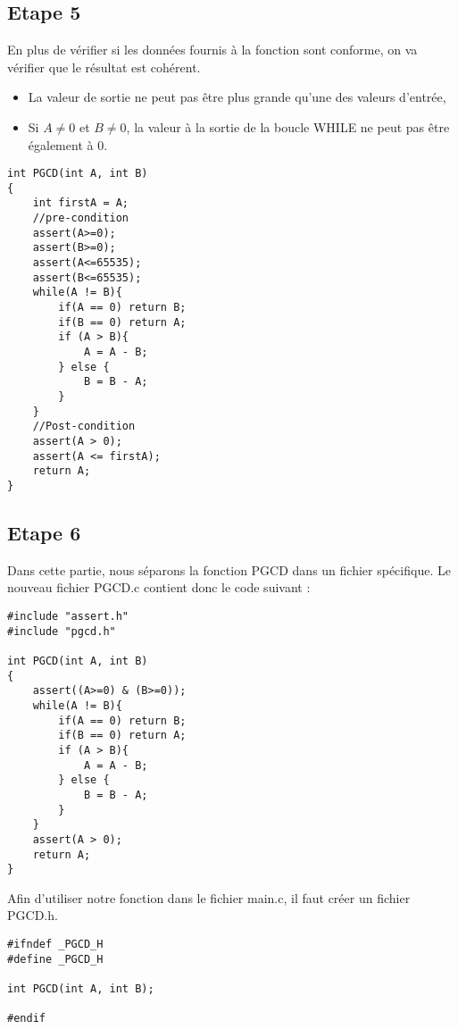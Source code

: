 \documentclass[a4paper]{article}
\begin{document}
    \subsection{Etape 5}
        En plus de vérifier si les données fournis à la fonction sont conforme, on va vérifier que le résultat est cohérent.
        \begin{itemize}
            \item La valeur de sortie ne peut pas être plus grande qu'une des valeurs d'entrée,
            \item Si $A \neq 0$ et $B \neq 0$, la valeur à la sortie de la boucle WHILE ne peut pas être également à 0.
        \end{itemize}
\begin{lstlisting}[style=CStyle]
int PGCD(int A, int B)
{
	int firstA = A;
    //pre-condition
	assert(A>=0);
	assert(B>=0);
	assert(A<=65535);
	assert(B<=65535);
	while(A != B){
		if(A == 0) return B;
		if(B == 0) return A;
		if (A > B){
			A = A - B;
		} else {
			B = B - A;
		}
	}
    //Post-condition
	assert(A > 0);
	assert(A <= firstA);
	return A;
}
\end{lstlisting}
        
    \subsection{Etape 6}
       Dans cette partie, nous séparons la fonction PGCD dans un fichier spécifique.
       Le nouveau fichier PGCD.c contient donc le code suivant :
\begin{lstlisting}[style=CStyle]
#include "assert.h"
#include "pgcd.h"

int PGCD(int A, int B)
{
    assert((A>=0) & (B>=0));
    while(A != B){
        if(A == 0) return B;
        if(B == 0) return A;
        if (A > B){
            A = A - B;
        } else {
            B = B - A;
        }
    }
    assert(A > 0);
    return A;
}    
\end{lstlisting}

        Afin d'utiliser notre fonction dans le fichier main.c, il faut créer un fichier PGCD.h.
\begin{lstlisting}[style=CStyle]
#ifndef _PGCD_H
#define _PGCD_H 

int PGCD(int A, int B);

#endif   
\end{lstlisting}
\end{document}
